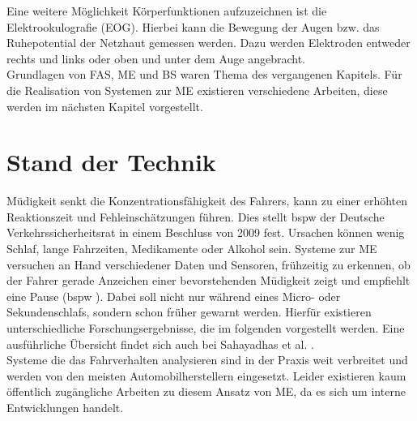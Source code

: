 {Eine weitere Möglichkeit Körperfunktionen aufzuzeichnen ist die Elektrookulografie (EOG). Hierbei kann die Bewegung der Augen bzw. das Ruhepotential der Netzhaut gemessen werden. Dazu werden Elektroden entweder rechts und links oder oben und unter dem Auge angebracht.\\

Grundlagen von \acl{FAS}, \acl{ME} und \acl{BS} waren Thema des vergangenen Kapitels. Für die Realisation von Systemen zur \acl{ME} existieren verschiedene Arbeiten, diese werden im nächsten Kapitel vorgestellt.

\section{Stand der Technik}
\label{chap:me}
Müdigkeit senkt die Konzentrationsfähigkeit des Fahrers, kann zu einer erhöhten Reaktionszeit und Fehleinschätzungen führen. Dies stellt \acl{bspw} der Deutsche Verkehrssicherheitsrat in einem Beschluss von 2009 \cite{DVR:Online} fest. Ursachen können wenig Schlaf, lange Fahrzeiten, Medikamente oder Alkohol sein.
Systeme zur \acl{ME} versuchen an Hand verschiedener Daten und Sensoren, frühzeitig zu erkennen, ob der Fahrer gerade Anzeichen einer bevorstehenden Müdigkeit zeigt und empfiehlt eine Pause (\acl{bspw} \cite{Daimler}). Dabei soll nicht nur während eines Micro- oder Sekundenschlafs, sondern schon früher gewarnt werden. Hierfür existieren unterschiedliche Forschungsergebnisse, die im folgenden vorgestellt werden. Eine ausführliche Übersicht findet sich auch bei Sahayadhas et al.  \cite{Sahayadhas_121216937}.\\

Systeme die das Fahrverhalten analysieren sind in der Praxis weit verbreitet und werden von den meisten Automobilherstellern eingesetzt. Leider existieren kaum öffentlich zugängliche Arbeiten zu diesem Ansatz von  \acl{ME}, da es sich um interne Entwicklungen handelt. \\

}
